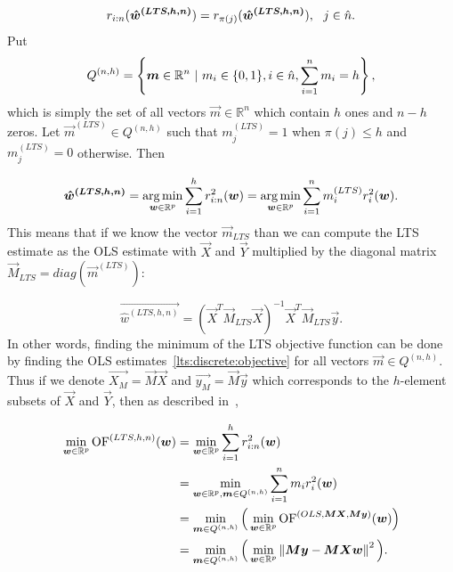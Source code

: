 \begin{equation}
    r_{i:n}(\vec{\hat{w}^{(LTS, h, n)}}) = r_{\pi(j)}(\vec{\hat{w}^{(LTS, h, n)}})\\, \ \ j \in \hat{n}.
\end{equation}
Put
 \begin{equation}
   Q^{(n,h)} = \left\{ \vec{m} \in \mathbb{R}^n \ | \ m_i \in \{{0, 1\}} \\,i \in \hat{n} \\,   \sum\limits_{i=1}^n  m_i = h \right\},
\end{equation}
which is simply the set of all vectors $\vec{m} \in \mathbb{R}^n$ which contain $h$ ones and $n-h$ zeros. Let $\vec{m}^{(LTS)} \in Q^{(n,h)}$  such that  $m^{(LTS)}_j = 1$ when $\pi(j) \leq h$ and $m^{(LTS)}_j = 0$ otherwise. Then

\begin{equation} \label{ltshat}
    \vec{\hat{w}^{(LTS, h, n)}} =  
  \argmin_{\vec{w} \in \mathbb{R}^p} \sum\limits_{i=1}^h r_{i:n}^2(\vec{w}) = 
  \argmin_{\vec{w} \in \mathbb{R}^p} \sum\limits_{i=1}^n m^{(LTS)}_i r_{i}^2(\vec{w}). 
\end{equation}
This means that if we know the vector $\vec{m}_{LTS}$ than we can compute the LTS estimate as the OLS estimate with $\vec{X}$ and $\vec{Y}$ multiplied by the diagonal matrix $\vec{M}_{LTS} = diag(\vec{m}^{(LTS)})$:

\begin{equation}  \label{lts:discrete:objective}
    \vec{\hat{w}^{(LTS, h, n)}} = (\vec{X}^T\vec{M}_{LTS}\vec{X})^{-1}\vec{X}^T\vec{M}_{LTS}\vec{y}.
\end{equation}
In other words, finding the minimum of the LTS objective function can be done by finding the OLS estimates~\eqref{lts:discrete:objective} for all vectors 
$\vec{m} \in Q^{(n,h)}$. 
Thus if we denote $\vec{X_{M}} = \vec{M}\vec{X} $ and $\vec{y_{M}} = \vec{M}\vec{y}$ which corresponds to the $h$-element subsets of $\vec{X}$ and $\vec{Y}$, then as described in~\cite{kloudaVyzkumnyUkol},




\begin{align} \label{kloudaodvozeni}
\minim_{\vec{w} \in \mathbb{R}^p} 
    \of^{(LTS, h, n)}(\vec{w})  
&=\minim_{\vec{w} \in \mathbb{R}^p} 
    \sum\limits_{i=1}^h r_{i:n}^2(\vec{w})  \\
&= \minim_{\vec{w} \in \mathbb{R}^p,\vec{m} \in Q^{(n,h)}} 
        \sum\limits_{i=1}^n m_i r_{i}^2(\vec{w})\\
&= \minim_{\vec{m} \in Q^{(n,h)}} 
            \Big( \minim_{\vec{w} \in\mathbb{R}^p} 
            \of^{(OLS,\vec{M}\vec{X},  \vec{M}\vec{y} )} (\vec{w}) \Big)\\
&= \minim_{\vec{m} \in Q^{(n,h)}} 
            \Big(\minim_{\vec{w} \in\mathbb{R}^p}  
            \norm{ \vec{M}\vec{y} -   \vec{M}\vec{X}\vec{w}  }^2 \Big).
\end{align}

